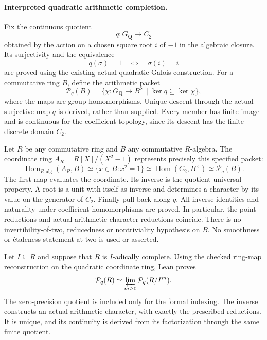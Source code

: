 \documentclass[11pt]{article}
\theoremstyle{definition}
\theoremstyle{remark}
\newcommand{\Q}{\mathbf Q}
\newcommand{\Hom}{\operatorname{Hom}}
\begin{document}
\paragraph{Interpreted quadratic arithmetic completion.}\label{book:x-construction-21}
Fix the continuous quotient
\[
q:G_{\Q}\longrightarrow C_2
\]
obtained by the action on a chosen square root $i$ of $-1$ in the algebraic
closure. Its surjectivity and the equivalence
\[
q(\sigma)=1\quad\Longleftrightarrow\quad\sigma(i)=i
\]
are proved using the existing actual quadratic Galois construction.
For a commutative ring $B$, define the arithmetic packet
\[
\mathcal P_q(B)=
\{\chi:G_{\Q}\longrightarrow B^\times\mid\ker q\subseteq\ker\chi\},
\]
where the maps are group homomorphisms. Unique descent through the actual
surjective map $q$ is derived, rather than supplied. Every member has finite
image and is continuous for the coefficient topology, since its descent
has the finite discrete domain $C_2$.

Let $R$ be any commutative ring and $B$ any commutative $R$-algebra. The
coordinate ring $A_R=R[X]/(X^2-1)$ represents precisely this specified
packet:
\[
\Hom_{R\text{-alg}}(A_R,B)
\simeq\{x\in B:x^2=1\}
\simeq\Hom(C_2,B^\times)
\simeq\mathcal P_q(B).
\]
The first map evaluates the coordinate. Its inverse is the quotient
universal property. A root is a unit with itself as inverse and determines
a character by its value on the generator of $C_2$. Finally pull back
along $q$. All inverse identities and naturality under coefficient
homomorphisms are proved. In particular, the point reductions and actual
arithmetic character reductions coincide. There is no invertibility-of-two,
reducedness or nontriviality hypothesis on $B$. No smoothness or
\'{e}taleness statement at two is used or asserted.

Let $I\subseteq R$ and suppose that $R$ is $I$-adically complete. Using
the checked ring-map reconstruction on the quadratic coordinate ring,
Lean proves
\[
\mathcal P_q(R)\simeq\varprojlim_{m\ge0}\mathcal P_q(R/I^m).
\]
The zero-precision quotient is included only for the formal indexing.
The inverse constructs an actual arithmetic character, with exactly the
prescribed reductions. It is unique, and its continuity is derived from
its factorization through the same finite quotient.
\end{document}
